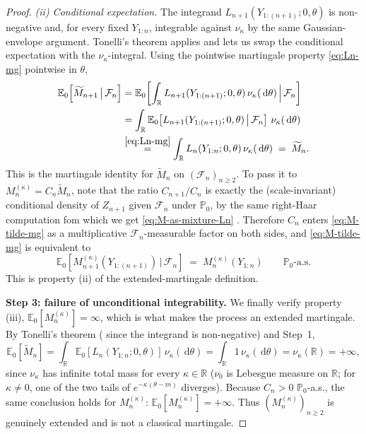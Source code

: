 \documentclass[numsec,webpdf,modern,medium,namedate]{oup-authoring-template}
\theoremstyle{thmstyleone}%
\theoremstyle{thmstyletwo}%
\theoremstyle{thmstylethree}%
\newcommand{\dd}{\,\mathrm{d}}
\newcommand{\1}{\mathbf{1}}
\begin{document}
\begin{appendices}
\begin{proof}
\smallskip\noindent\emph{(ii) Conditional expectation.}
The integrand $L_{n+1}(Y_{1:(n+1)};0,\theta)$ is non-negative and, for every
fixed $Y_{1:n}$, integrable against $\nu_\kappa$ by the same Gaussian-envelope
argument. Tonelli's theorem applies and lets us swap the conditional
expectation with the $\nu_\kappa$-integral. Using the pointwise martingale
property \eqref{eq:Ln-mg} pointwise in $\theta$,
\begin{align}
   \mathbb{E}_0\!\left[\widetilde M_{n+1}\,\big|\,\mathcal{F}_n\right]
   &= \mathbb{E}_0\!\left[\int_\mathbb{R} L_{n+1}(Y_{1:(n+1)};0,\theta)\,
       \nu_\kappa(\dd\theta)\,\Big|\,\mathcal{F}_n\right]\notag\\
   &= \int_\mathbb{R} \mathbb{E}_0\!\left[L_{n+1}(Y_{1:(n+1)};0,\theta)\,\big|\,
       \mathcal{F}_n\right]\,\nu_\kappa(\dd\theta)\notag\\
   &\overset{\eqref{eq:Ln-mg}}{=} \int_\mathbb{R} L_n(Y_{1:n};0,\theta)\,
       \nu_\kappa(\dd\theta)
   \;=\; \widetilde M_n.
   \label{eq:M-tilde-mg}
\end{align}
This is the martingale identity for $\widetilde M_n$ on
$(\mathcal{F}_n)_{n\geq 2}$. To pass it to $M_n^{(\kappa)} = C_n\widetilde M_n$,
note that the ratio $C_{n+1}/C_n$ is exactly the (scale-invariant) conditional
density of $Z_{n+1}$ given $\mathcal{F}_n$ under $\mathbb{P}_0$, by the same right-Haar computation fom which we get \eqref{eq:M-as-mixture-Ln}  \cite[Cor.~4.6]{Wang2025}. Therefore $C_n$ enters
\eqref{eq:M-tilde-mg} as a multiplicative $\mathcal{F}_n$-measurable factor
on both sides, and \eqref{eq:M-tilde-mg} is equivalent to
\begin{equation}\label{eq:Mkappa-mg}
   \mathbb{E}_0\!\left[M_{n+1}^{(\kappa)}(Y_{1:(n+1)})\,\big|\,\mathcal{F}_n\right]
   \;=\; M_n^{(\kappa)}(Y_{1:n})
   \qquad\mathbb{P}_0\text{-a.s.}
\end{equation}
This is property (ii) of the extended-martingale definition.

\textbf{Step 3: failure of unconditional integrability.}
We finally verify property (iii), $\mathbb{E}_0[M_n^{(\kappa)}] = \infty$, which
is what makes the process an extended martingale. By Tonelli's theorem
( since the integrand is non-negative) and Step~1,
\[
   \mathbb{E}_0\!\left[\widetilde M_n\right]
   = \int_\mathbb{R} \mathbb{E}_0\!\left[L_n(Y_{1:n};0,\theta)\right]\,
       \nu_\kappa(\dd\theta)
   = \int_\mathbb{R} 1\,\nu_\kappa(\dd\theta)
   = \nu_\kappa(\mathbb{R}) = +\infty,
\]
since $\nu_\kappa$ has infinite total mass for every $\kappa\in\mathbb{R}$
($\nu_0$ is Lebesgue measure on $\mathbb{R}$; for $\kappa\neq 0$, one of the
two tails of $e^{-\kappa(\theta-m)}$ diverges). Because $C_n > 0$
$\mathbb{P}_0$-a.s., the same conclusion holds for $M_n^{(\kappa)}$:
$\mathbb{E}_0[M_n^{(\kappa)}] = +\infty$. Thus $(M_n^{(\kappa)})_{n\geq 2}$ is
genuinely extended and is not a classical martingale.


\end{proof}
\end{appendices}
\end{document}
